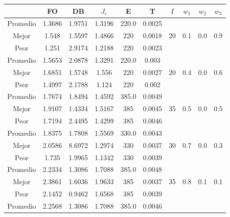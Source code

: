 \begin{table}[h!]
    \footnotesize
    \begin{center}
        \begin{tabular}{|c|c|c|c|c|c|c|c|c|c|}
        \hline
            & {\bf FO} & {\bf DB} & $J_e$ & {\bf E} & {\bf T} & $I$ & $w_1$ & $w_2$ & $w_3$ \\
        \hline
        \hline
            Promedio  & 1.3686 & 1.9751 & 1.3196 & 220.0 & 0.0025 &  &  &  & \\
            \cline{1-6}
            Mejor & 1.548 & 1.5597  & 1.4866 & 220 & 0.0018 & 20 & 0.1 & 0.0 & 0.9\\
            \cline{1-6}
            Peor & 1.251 & 2.9174  & 1.2188 & 220 & 0.0023 &  &  &  & \\
        \hline
        \hline
            Promedio  & 1.5653 & 2.0878 & 1.3291 & 220.0 & 0.003 &  &  &  & \\
            \cline{1-6}
            Mejor & 1.6851 & 1.5748  & 1.556 & 220 & 0.0027 & 20 & 0.4 & 0.0 & 0.6\\
            \cline{1-6}
            Peor & 1.4997 & 2.1788  & 1.124 & 220 & 0.002 &  &  &  & \\
        \hline
        \hline
            Promedio  & 1.7674 & 1.8494 & 1.4592 & 385.0 & 0.0049 &  &  &  & \\
            \cline{1-6}
            Mejor & 1.9107 & 1.4334  & 1.5167 & 385 & 0.0045 & 35 & 0.5 & 0.0 & 0.5\\
            \cline{1-6}
            Peor & 1.7194 & 2.4495  & 1.4299 & 385 & 0.0046 &  &  &  & \\
        \hline
        \hline
            Promedio  & 1.8375 & 1.7808 & 1.5569 & 330.0 & 0.0043 &  &  &  & \\
            \cline{1-6}
            Mejor & 2.0586 & 8.6972  & 1.2974 & 330 & 0.0037 & 30 & 0.7 & 0.0 & 0.3\\
            \cline{1-6}
            Peor & 1.735 & 1.9965  & 1.1342 & 330 & 0.0039 &  &  &  & \\
        \hline
        \hline
            Promedio  & 2.2334 & 1.3086 & 1.7088 & 385.0 & 0.0048 &  &  &  & \\
            \cline{1-6}
            Mejor & 2.3861 & 1.6036  & 1.9633 & 385 & 0.0037 & 35 & 0.8 & 0.1 & 0.1\\
            \cline{1-6}
            Peor & 2.1452 & 0.9462  & 1.6568 & 385 & 0.0039 &  &  &  & \\
        \hline
        \hline
            Promedio  & 2.2568 & 1.3086 & 1.7088 & 385.0 & 0.0046 &  &  &  & \\

\end{tabular}
\end{center}
\end{table}
